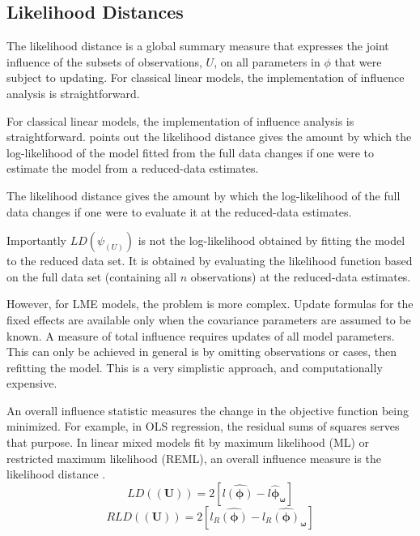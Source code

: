 \documentclass[12pt, a4paper]{report}
\theoremstyle{plain}
\theoremstyle{definition}
\theoremstyle{remark}
\begin{document}
	

	\subsection{Likelihood Distances}
	
	The  likelihood distance is a global summary measure that expresses the joint influence of the subsets of observations, $U$, on all parameters in $\phi$ that were subject to updating. For classical linear models, the implementation of influence analysis is straightforward.
	
	
	For classical linear models, the implementation of influence analysis is straightforward. \citet{schabenberger} points out the likelihood distance gives the amount by which the log-likelihood of the model fitted from the full data changes if one were
	to estimate the model from a reduced-data estimates.
	
	The likelihood distance gives the amount by which the log-likelihood of the full data changes if one were to evaluate it at the reduced-data estimates. 
	

	
	Importantly $LD(\psi_{(U)})$ is not the log-likelihood obtained by fitting the model to the reduced data set. It is obtained by evaluating the likelihood function based on the full data set (containing all $n$ observations) at the reduced-data estimates.
	
	
	However, for LME models, the problem is more complex. Update formulas for the fixed effects are available only when the covariance parameters are assumed to be known. A measure of total influence requires updates of all model parameters. This can only be achieved in general is by omitting observations or cases, then refitting the model. This is a very simplistic approach, and computationally expensive.
	
	
	
	An overall influence statistic measures the change in the objective function being minimized. For example, in
	OLS regression, the residual sums of squares serves that purpose. In linear mixed models fit by
	 maximum likelihood (ML) or  restricted maximum likelihood (REML), an overall influence measure is the  likelihood distance \citep{cook}.
	\[  LD(\boldsymbol{(U)})= 2[l\boldsymbol{\hat{(\phi)}} - l\boldsymbol{\hat{\phi}_\omega} ] \]
	\[  RLD(\boldsymbol{(U)})= 2[ l_R\boldsymbol{\hat{(\phi)}} - l_R\boldsymbol{\hat{(\phi)}_\omega} ] \]
	
\end{document}
